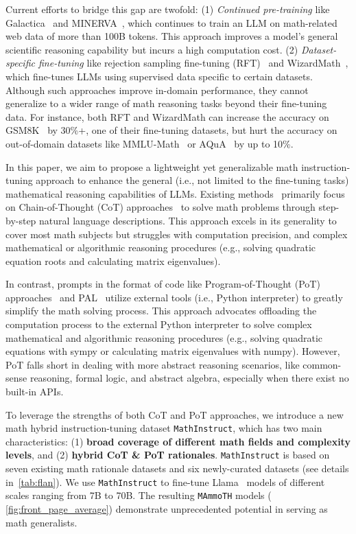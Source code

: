 Current efforts to bridge this gap are twofold: (1) \textit{Continued pre-training} like Galactica~\citep{taylor2022galactica} and MINERVA~\citep{lewkowycz2022solving}, which continues to train an LLM on math-related web data of more than 100B tokens. This approach improves a model's general scientific reasoning capability but incurs a high computation cost. (2) \textit{Dataset-specific fine-tuning} like rejection sampling fine-tuning (RFT)~\citep{yuan2023scaling} and WizardMath~\citep{luo2023wizardmath}, which fine-tunes LLMs using supervised data specific to certain datasets. Although such approaches improve in-domain performance, they cannot generalize to a wider range of math reasoning tasks beyond their fine-tuning data. For instance, both RFT and WizardMath can increase the accuracy on GSM8K~\citep{cobbe2021training} by 30\%+, one of their fine-tuning datasets, but hurt the accuracy on out-of-domain datasets like MMLU-Math~\citep{hendrycks2020measuring} or AQuA~\citep{ling2017program} by up to 10\%. 

In this paper, we aim to propose a lightweight yet generalizable math instruction-tuning approach to enhance the general (i.e., not limited to the fine-tuning tasks) mathematical reasoning capabilities of LLMs. Existing methods~\citep{luo2023wizardmath,yuan2023scaling,taylor2022galactica} primarily focus on Chain-of-Thought (CoT) approaches~\citep{wei2022chain,nye2022show} to solve math problems through step-by-step natural language descriptions. This approach excels in its generality to cover most math subjects but struggles with computation precision, and complex mathematical or algorithmic reasoning procedures (e.g., solving quadratic equation roots and calculating matrix eigenvalues).

In contrast, prompts in the format of code like Program-of-Thought (PoT) approaches~\citep{chen2022program} and PAL~\citep{madaan2022language, gao2023pal} utilize external tools (i.e., Python interpreter) to greatly simplify the math solving process. This approach advocates offloading the computation process to the external Python interpreter to solve complex mathematical and algorithmic reasoning procedures (e.g., solving quadratic equations with sympy or calculating matrix eigenvalues with numpy). However, PoT falls short in dealing with more abstract reasoning scenarios, like common-sense reasoning, formal logic, and abstract algebra, especially when there exist no built-in APIs. 

To leverage the strengths of both CoT and PoT approaches, we introduce a new math hybrid instruction-tuning dataset \texttt{MathInstruct}, which has two main characteristics: (1) \textbf{broad coverage of different math fields and complexity levels}, and (2) \textbf{hybrid CoT \& PoT rationales}. \texttt{MathInstruct} is based on seven existing math rationale datasets and six newly-curated datasets (see details in~\autoref{tab:flan}). We use \texttt{MathInstruct} to fine-tune Llama~\citep{touvron2023llama1,touvron2023llama2,roziere2023code} models of different scales ranging from 7B to 70B. The resulting \texttt{MAmmoTH} models ( \autoref{fig:front_page_average}) demonstrate unprecedented potential in serving as math generalists. 

